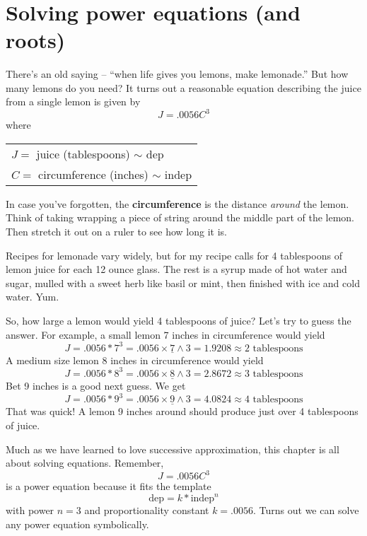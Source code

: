  ~\vspace{.1in}

\section{Solving power equations (and roots)}

There's an old saying -- ``when life gives you lemons, make lemonade.''  But how many lemons do you need? It turns out a reasonable equation describing the juice from a single lemon is given by 
$$J = .0056C^3$$ where %
\vspace{-.15in} %
\begin{center}
\begin{tabular} {l} 
$J=$ juice (tablespoons) $\sim$ dep \\
$C= $ circumference (inches) $\sim$ indep \\ 
\end{tabular}
\end{center}
In case you've forgotten, the \textbf{circumference} is the distance \emph{around} the lemon. Think of taking wrapping a piece of string around the middle part of the lemon. Then stretch it out on a ruler to see how long it is.  

Recipes for lemonade vary widely, but for my recipe calls for 4 tablespoons of lemon juice for each 12 ounce glass.  The rest is a syrup made of hot water and sugar, mulled with a sweet herb like basil or mint, then finished with ice and cold water. Yum.  

So, how large a lemon would yield 4 tablespoons of juice? Let's try to guess the answer.  
For example, a small lemon 7 inches in circumference would yield 
$$J = .0056 \ast 7^3 = .0056 \times \underline{7} \wedge 3 = 1.9208 \approx 2 \text{ tablespoons}$$ 
A medium size lemon 8 inches in circumference would yield
$$J = .0056 \ast 8^3 = .0056 \times \underline{8} \wedge 3 = 2.8672 \approx 3 \text{ tablespoons}$$ 
Bet 9 inches is a good next guess.  We get
$$J = .0056 \ast 9^3 = .0056 \times \underline{9} \wedge 3 = 4.0824 \approx 4  \text{ tablespoons}$$ 
That was quick!   A lemon 9 inches around should produce just over 4 tablespoons of juice.  %

Much as we have learned to love successive approximation, this chapter is all about solving equations.  Remember, $$J = .0056C^3$$ is a power equation because it fits the template  
$$\text{dep} = k \ast \text{indep}^{n}$$
with power $n=3$ and proportionality constant $k=.0056$.  Turns out we can solve any power equation symbolically.  

